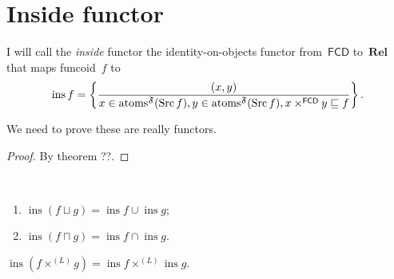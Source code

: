\chapter{Inside functor}

\begin{defn}
I will call the \emph{inside} functor the identity-on-objects functor from~$\mathsf{FCD}$ to~$\mathbf{Rel}$ that maps
funcoid~$f$ to
\[
\operatorname{ins} f =
\left\{ \frac{(x,y)}{x\in\operatorname{atoms}^{\mathfrak{F}}(\operatorname{Src} f), y\in\operatorname{atoms}^{\mathfrak{F}}(\operatorname{Src} f), x\times^{\mathsf{FCD}}y\sqsubseteq f}\right\}. \]
\end{defn}

We need to prove these are really functors.

\begin{proof}
By theorem ??.
\end{proof}

\begin{prop}
~
\begin{enumerate}
\item $\operatorname{ins}(f\sqcup g)=\operatorname{ins}f\cup\operatorname{ins}g$;
\item $\operatorname{ins}(f\sqcap g)=\operatorname{ins}f\cap\operatorname{ins}g$.
\end{enumerate}
\end{prop}

\begin{prop}
$\operatorname{ins}(f\times^{(L)} g) =
\operatorname{ins}f\times^{(L)}\operatorname{ins}g$.
\end{prop}